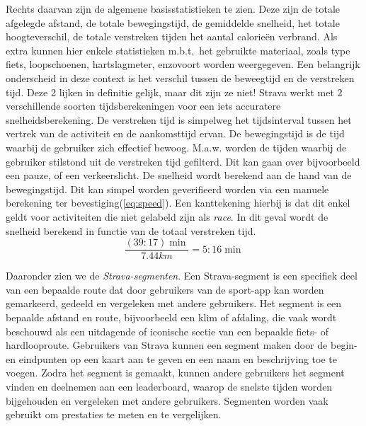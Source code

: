 Rechts daarvan zijn de algemene basisstatistieken te zien. Deze zijn de totale
afgelegde afstand, de totale bewegingstijd, de gemiddelde snelheid, het totale
hoogteverschil, de totale verstreken tijden het aantal calorieën verbrand. Als
extra kunnen hier enkele statistieken m.b.t.\ het gebruikte materiaal, zoals
type fiets, loopschoenen, hartslagmeter, enzovoort worden weergegeven. Een
belangrijk onderscheid in deze context is het verschil tussen de beweegtijd en
de verstreken tijd. Deze 2 lijken in definitie gelijk, maar dit zijn ze niet!
Strava werkt met 2 verschillende soorten tijdsberekeningen voor een iets
accuratere snelheidsberekening. De verstreken tijd is simpelweg het
tijdsinterval tussen het vertrek van de activiteit en de aankomsttijd ervan. De
bewegingstijd is de tijd waarbij de gebruiker zich effectief bewoog. M.a.w.
worden de tijden waarbij de gebruiker stilstond uit de verstreken tijd
gefilterd. Dit kan gaan over bijvoorbeeld een pauze, of een verkeerslicht. De
snelheid wordt berekend aan de hand van de bewegingstijd. Dit kan simpel worden
geverifieerd worden via een manuele berekening ter bevestiging(\ref{eq:speed}).
Een kanttekening hierbij is dat dit enkel geldt voor activiteiten die niet
gelabeld zijn als \textit{race}. In dit geval wordt de snelheid berekend in
functie van de totaal verstreken tijd.\cite{MovingTi80:online}
\begin{equation}\label{eq:speed}
    \frac{(39:17)\min}{7.44 km} = 5:16 \min
\end{equation}

Daaronder zien we de \textit{Strava-segmenten}. Een Strava-segment is een
specifiek deel van een bepaalde route dat door gebruikers van de sport-app kan
worden gemarkeerd, gedeeld en vergeleken met andere gebruikers. Het segment is
een bepaalde afstand en route, bijvoorbeeld een klim of afdaling, die vaak
wordt beschouwd als een uitdagende of iconische sectie van een bepaalde fiets-
of hardlooproute. Gebruikers van Strava kunnen een segment maken door de begin-
en eindpunten op een kaart aan te geven en een naam en beschrijving toe te
voegen. Zodra het segment is gemaakt, kunnen andere gebruikers het segment
vinden en deelnemen aan een leaderboard, waarop de snelste tijden worden
bijgehouden en vergeleken met andere gebruikers. Segmenten worden vaak gebruikt
om prestaties te meten en te vergelijken.


